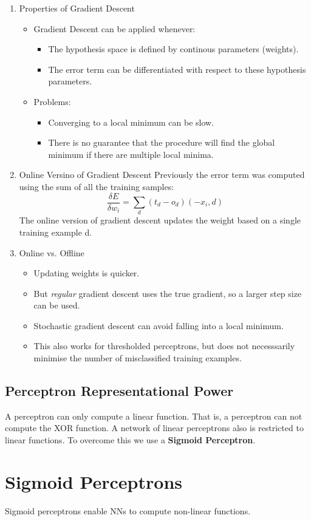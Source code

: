 \documentclass[11pt]{article}
\begin{document}
\begin{enumerate}
\item Properties of Gradient Descent
\label{sec:org8ae5e6d}
\begin{itemize}
\item Gradient Descent can be applied whenever:
\begin{itemize}
\item The hypothesis space is defined by continous parameters (weights).
\item The error term can be differentiated with respect to these hypothesis parameters.
\end{itemize}
\item Problems:
\begin{itemize}
\item Converging to a local minimum can be slow.
\item There is no guarantee that the procedure will find the global minimum if there are multiple local minima.
\end{itemize}
\end{itemize}
\item Online Versino of Gradient Descent
\label{sec:org3485a32}
Previously the error term was computed using the sum of all the training samples:
\begin{equation}
\frac{{\delta}E}{{\delta}w_i} = \sum\limits_d(t_d - o_d)(-x_i, d)
\end{equation}
The online version of gradient descent updates the weight based on a single training example d.
\item Online vs. Offline
\label{sec:orgdcadf84}
\begin{itemize}
\item Updating weights is quicker.
\item But \emph{regular} gradient descent uses the true gradient, so a larger step size can be used.
\item Stochastic gradient descent can avoid falling into a local minimum.
\item This also works for thresholded perceptrons, but does not necesssarily minimise the number of misclassified training examples.
\end{itemize}
\end{enumerate}
\subsection{Perceptron Representational Power}
\label{sec:org79d1744}
A perceptron can only compute a linear function.
That is, a perceptron can not compute the XOR function.
A network of linear perceptrons also is restricted to linear functions.
To overcome this we use a \textbf{Sigmoid Perceptron}.
\section{Sigmoid Perceptrons}
\label{sec:org9d02ab5}
Sigmoid perceptrons enable NNs to compute non-linear functions.
\end{document}
